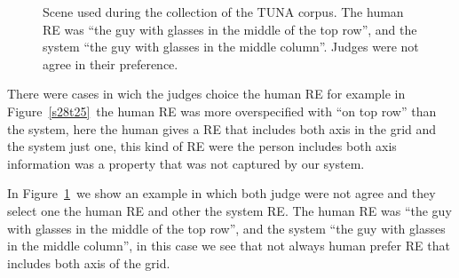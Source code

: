 \begin{figure}[ht]
\begin{minipage}{0.50\linewidth}
\caption{Scene used during the collection of the TUNA corpus. The human RE was ``the guy with glasses in the middle of the top row'', and the system ``the guy with glasses in the middle column''. Judges were not agree in their preference.}
\label{s307t21}
\end{minipage}
\end{figure}

There were cases in wich the judges choice the human RE for example in Figure~\ref{s28t25}~the human RE was more overspecified with ``on top row'' than the system, here the human gives a RE that includes both axis in the grid and the system just one, this kind of RE were the person includes both axis information was a property that was not captured by our system.

In Figure~\ref{s307t21}~we show an example in which both judge were not agree and they select one the human RE and other the system RE.  The human RE was ``the guy with glasses in the middle of the top row'', and the system ``the guy with glasses in the middle column'', in this case we see that not always human prefer RE that includes both axis of the grid.

